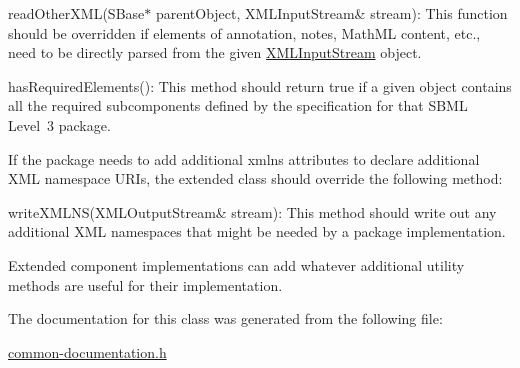 \begin{DoxyItemize}
\item {\ttfamily read\+Other\+X\+M\+L(\+S\+Base$\ast$ parent\+Object, X\+M\+L\+Input\+Stream\& stream)}\+: This function should be overridden if elements of annotation, notes, Math\+ML content, etc., need to be directly parsed from the given \hyperlink{class_x_m_l_input_stream}{X\+M\+L\+Input\+Stream} object.\end{DoxyItemize}
\begin{DoxyItemize}
\item {\ttfamily has\+Required\+Elements()}\+: This method should return {\ttfamily true} if a given object contains all the required subcomponents defined by the specification for that S\+B\+ML Level~3 package.\end{DoxyItemize}


If the package needs to add additional {\ttfamily xmlns} attributes to declare additional X\+ML namespace U\+R\+Is, the extended class should override the following method\+:

\begin{DoxyItemize}
\item {\ttfamily write\+X\+M\+L\+N\+S(\+X\+M\+L\+Output\+Stream\& stream)}\+: This method should write out any additional X\+ML namespaces that might be needed by a package implementation.\end{DoxyItemize}


Extended component implementations can add whatever additional utility methods are useful for their implementation. 

The documentation for this class was generated from the following file\+:\begin{DoxyCompactItemize}
\item 
\hyperlink{common-documentation_8h}{common-\/documentation.\+h}\end{DoxyCompactItemize}

